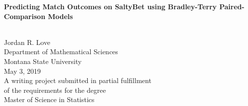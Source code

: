 \documentclass[12pt]{article}\usepackage[]{graphicx}\usepackage[]{color}\usepackage[]{subcaption}
\begin{document}
\begin{titlepage}
	\null
	\vspace{.5in}
	\begin{center}
		{\LARGE\bf Predicting Match Outcomes on SaltyBet using Bradley-Terry Paired-Comparison Models} \vspace{.1in}







		\vspace{.05in}
		{\LARGE\bf $\;$} \\ [.5in]
		{\Large  Jordan R. Love \\
			\vspace{0.5cm}
			Department of Mathematical Sciences \\
			Montana State University \\ [.5in]}
		May 3, 2019 \\ [1.in]
		A writing project submitted in partial fulfillment\\
		of the requirements for the degree\\[.25in]
		Master of Science in Statistics
	\end{center}
\end{titlepage}
\end{document}
